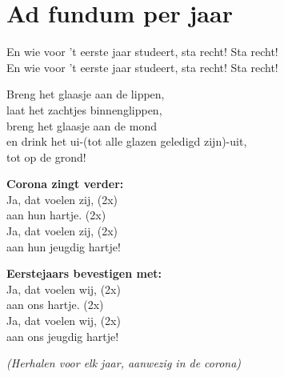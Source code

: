 \section{Ad fundum per jaar}
En wie voor 't eerste jaar studeert, sta recht! Sta recht!\\
En wie voor 't eerste jaar studeert, sta recht! Sta recht!

Breng het glaasje aan de lippen,\\
laat het zachtjes binnenglippen,\\
breng het glaasje aan de mond\\
en drink het ui-(tot alle glazen geledigd zijn)-uit,\\
tot op de grond!

\textbf{Corona zingt verder:}\\
Ja, dat voelen zij, (2x)\\
aan hun hartje. (2x)\\
Ja, dat voelen zij, (2x)\\
aan hun jeugdig hartje!

\textbf{Eerstejaars bevestigen met:}\\
Ja, dat voelen wij, (2x)\\
aan ons hartje. (2x)\\
Ja, dat voelen wij, (2x)\\
aan ons jeugdig hartje!

\textit{(Herhalen voor elk jaar, aanwezig in de corona)}
